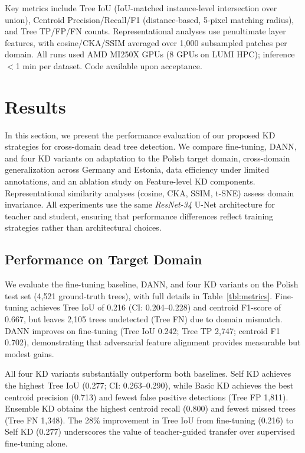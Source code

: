 \documentclass[twocolumn]{article}
\begin{document}
Key metrics include Tree IoU (IoU-matched instance-level intersection over union), Centroid Precision/Recall/F1 (distance-based, 5-pixel matching radius), and Tree TP/FP/FN counts. Representational analyses use penultimate layer features, with cosine/CKA/SSIM averaged over 1,000 subsampled patches per domain. All runs used AMD MI250X GPUs (8 GPUs on LUMI HPC); inference $<$1 min per dataset. Code available upon acceptance.

\section{Results}
\label{sec:results}

In this section, we present the performance evaluation of our proposed KD strategies for cross-domain dead tree detection. We compare fine-tuning, DANN, and four KD variants on adaptation to the Polish target domain, cross-domain generalization across Germany and Estonia, data efficiency under limited annotations, and an ablation study on Feature-level KD components. Representational similarity analyses (cosine, CKA, SSIM, t-SNE) assess domain invariance. All experiments use the same \textit{ResNet-34} U-Net architecture for teacher and student, ensuring that performance differences reflect training strategies rather than architectural choices.

\subsection{Performance on Target Domain}

We evaluate the fine-tuning baseline, DANN, and four KD variants on the Polish test set (4,521 ground-truth trees), with full details in Table~\ref{tbl:metrics}. Fine-tuning achieves Tree IoU of 0.216 (CI: 0.204--0.228) and centroid F1-score of 0.667, but leaves 2,105 trees undetected (Tree FN) due to domain mismatch. DANN improves on fine-tuning (Tree IoU 0.242; Tree TP 2,747; centroid F1 0.702), demonstrating that adversarial feature alignment provides measurable but modest gains.

All four KD variants substantially outperform both baselines. Self KD achieves the highest Tree IoU (0.277; CI: 0.263--0.290), while Basic KD achieves the best centroid precision (0.713) and fewest false positive detections (Tree FP 1,811). Ensemble KD obtains the highest centroid recall (0.800) and fewest missed trees (Tree FN 1,348). The 28\% improvement in Tree IoU from fine-tuning (0.216) to Self KD (0.277) underscores the value of teacher-guided transfer over supervised fine-tuning alone.
\end{document}
